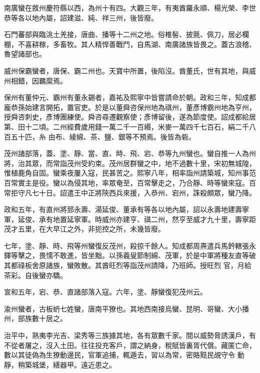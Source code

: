 \begin{pinyinscope}
 南廣蠻在敘州慶符縣以西，為州十有四。大觀三年，有夷酋羅永順、楊光榮、李世恭等各以地內屬，詔建滋、純、祥三州，後皆廢。



 石門蕃部與臨洮土羌接，唐曲、播等十二州之地。俗椎髻、披氈、佩刀，居必欄棚，不喜耕稼，多畜牧。其人精悍善戰鬥，自馬湖、南廣諸族皆畏之。蓋古浪稽、魯望諸部也。



 威州保霸蠻者，唐保、霸二州也。天寶中所置，後陷沒。酋董氏，世有其地，與威州相錯，因羈縻焉。



 保州有董仲元、霸州有董永錫者，嘉祐及熙寧中皆嘗請命於朝。政和三年，知成都龐恭孫始建言開拓，置官吏。於是以董舜咨保州地為祺州，董彥博霸州地為亨州，授舜咨刺史，彥博團練使。舜咨尋遷觀察使；彥博留後，遂為節度使。詔成都給居第、田十二頃。二州經費歲用錢一萬二千一百緡，米麥一萬四千七百石，絹二千八百五十匹，糸
 由布、綾綿、茶、鹽、銀等不預焉。後皆為砦。



 茂州諸部落，蓋、塗、靜、當、直、時、飛、宕、恭等九州蠻也。蠻自推一人為州將，治其眾，而常詣茂州受約束。茂州居群蠻之中，地不過數十里，宋初無城隍，惟植鹿角自固。蠻乘夜屢入寇，民甚苦之。熙寧八年，相率詣州請築城，知州事范百常實主是役。蠻以為侵其地，率眾奄至，百常擊走之，乃合靜、時等蠻來寇。百常拒守凡七十日。詔遣王中正將陝西兵來援，入恭州、宕州，誅殺頗眾，蠻乃降。



 政和五年，有直州將郅永壽、湯延俊、董承有等各以地內屬，詔以永壽地建壽寧軍，延俊、承有地置延寧軍。時威州亦建亨、祺二州，然亨至威才九十里，壽寧距茂才五里，在大早江之外，非扼控之所，未幾皆廢。



 七年，塗、靜、時、飛等州蠻復反茂州，殺掠千餘人。知成都周燾遣兵馬鈐轄張永鐸等擊之，畏懦不敢進，皆坐黜。以孫羲叟節制綿、茂軍，於是中軍將種友直等破其都祿板舍原諸族，蠻敗散。其酋旺烈等詣茂州請降，乃班師。授旺烈
 官，月給茶彩。自後蠻亦驕。



 宣和五年，宕、恭、直諸部落入寇。六年，塗、靜蠻復犯茂州云。



 渝州蠻者，古板蚒七姓蠻，唐南平獠也。其地西南接烏蠻、昆明、哥蠻、大小播州，部族數十居之。



 治平中，熟夷李光吉、梁秀等三族據其地，各有眾數千家。間以威勢脅誘漢戶，有不從者屠之，沒入土田。往往投充客戶，謂之納身，稅賦皆裏胥代償。藏匿亡命，數以其徒偽為生獠動邊民，官軍追捕，輒遁去，習以為常，密賂黠民覘守令
 動靜，稍築城堡，繕器甲。遠近患之。




\end{pinyinscope}
